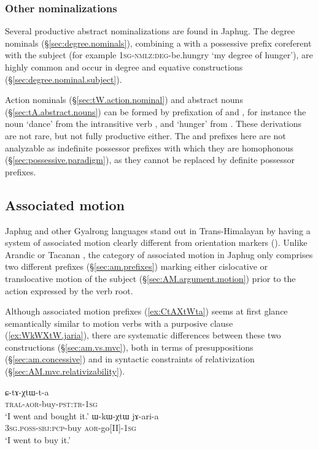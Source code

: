 \subsubsection{Other nominalizations}
Several productive abstract nominalizations are found in Japhug. The degree nominals (§\ref{sec:degree.nominals}), combining a  with a possessive prefix coreferent with the subject (for example  \textsc{1sg}-\textsc{nmlz}:\textsc{deg}-be.hungry `my degree of hunger'), are highly common and occur in degree and equative constructions (§\ref{sec:degree.nominal.subject}).

Action nominals (§\ref{sec:tW.action.nominal}) and abstract nouns (§\ref{sec:tA.abstract.nouns}) can be formed by prefixation of  and , for instance the noun  `dance' from the intransitive verb , and  `hunger' from . These derivations are not rare, but not fully productive either. The  and  prefixes here are not analyzable as indefinite possessor prefixes with which they are homophonous (§\ref{sec:possessive.paradigm}), as they cannot be replaced by definite possessor prefixes.

\subsection{Associated motion} \label{sec:am.intro}
Japhug and other Gyalrong languages stand out in Trans-Himalayan by having a system of associated motion clearly different from orientation markers (\citealt{jacques20am-st}). Unlike Arandic \citep{koch84associated.motion} or Tacanan \citep{guillaume09mouv.assoc}, the category of associated motion in Japhug only comprises two different prefixes (§\ref{sec:am.prefixes}) marking either cislocative or translocative motion of the subject (§\ref{sec:AM.argument.motion}) prior to the action expressed by the verb root.

Although associated motion prefixes (\ref{ex:CtAXtWta}) seems at first glance semantically similar to motion verbs with a purposive clause (\ref{ex:WkWXtW.jaria}), there are systematic differences between these two constructions (§\ref{sec:am.vs.mvc}), both in terms of presuppositions (§\ref{sec:am.concessive}) and in syntactic constraints of relativization (§\ref{sec:AM.mvc.relativizability}).

\begin{exe} 
\ex 
\begin{xlist}
\ex \label{ex:CtAXtWta}
\gll ɕ-tɤ-χtɯ-t-a   \\
\textsc{tral}-\textsc{aor}-buy-\textsc{pst}:\textsc{tr}-\textsc{1sg} \\
\glt `I went and bought it.' 
\ex \label{ex:WkWXtW.jaria}
\gll ɯ-kɯ-χtɯ jɤ-ari-a \\
\textsc{3sg}.\textsc{poss}-\textsc{sbj}:\textsc{pcp}-buy \textsc{aor}-go[II]-\textsc{1sg} \\
\glt `I went to buy it.' 
\end{xlist}
\end{exe} 

